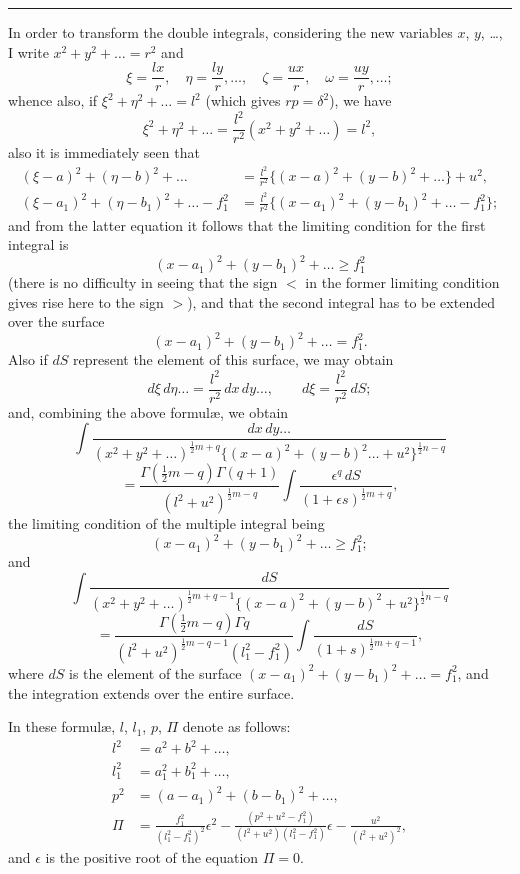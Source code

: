 \documentclass[11pt]{article}
\begin{document}
\vspace{1em}
\noindent\rule{\textwidth}{0.4pt}
\vspace{0.5em}

\noindent In order to transform the double integrals, considering the new variables $x$, $y$, \ldots, I write $x^2+y^2+\ldots = r^2$ and
\[
\xi = \frac{lx}{r}, \quad \eta = \frac{ly}{r}, \ldots, \quad \zeta = \frac{ux}{r}, \quad \omega = \frac{uy}{r}, \ldots;
\]
whence also, if $\xi^2 + \eta^2 + \ldots = l^2$ (which gives $rp = \delta^2$), we have
\[
\xi^2 + \eta^2 + \ldots = \frac{l^2}{r^2}(x^2+y^2+\ldots) = l^2,
\]
also it is immediately seen that
\begin{align*}
(\xi-a)^2 + (\eta-b)^2 + \ldots &= \frac{l^2}{r^2}\{(x-a)^2 + (y-b)^2 + \ldots\} + u^2,\\
(\xi-a_1)^2 + (\eta-b_1)^2 + \ldots - f_1^2 &= \frac{l^2}{r^2}\{(x-a_1)^2 + (y-b_1)^2 + \ldots - f_1^2\};
\end{align*}
and from the latter equation it follows that the limiting condition for the first integral is
\[
(x-a_1)^2 + (y-b_1)^2 + \ldots \ge f_1^2
\]
(there is no difficulty in seeing that the sign $<$ in the former limiting condition gives rise here to the sign $>$), and that the second integral has to be extended over the surface
\[
(x-a_1)^2 + (y-b_1)^2 + \ldots = f_1^2.
\]
Also if $dS$ represent the element of this surface, we may obtain
\[
d\xi\, d\eta \ldots = \frac{l^2}{r^2}\, dx\, dy \ldots, \qquad d\xi = \frac{l^2}{r^2}\, dS;
\]
and, combining the above formul\ae, we obtain
\[
\int \frac{dx\, dy \ldots}{(x^2+y^2+\ldots)^{\frac{1}{2}m+q}\{(x-a)^2+(y-b)^2\ldots+u^2\}^{\frac{1}{2}n-q}}
\]
\[
= \frac{\Gamma(\frac{1}{2}m-q)\Gamma(q+1)}{(l^2+u^2)^{\frac{1}{2}m-q}} \int \frac{\epsilon^q \, dS}{(1+\epsilon s)^{\frac{1}{2}m+q}},
\]
the limiting condition of the multiple integral being
\[
(x-a_1)^2 + (y-b_1)^2 + \ldots \ge f_1^2;
\]
and
\[
\int \frac{dS}{(x^2+y^2+\ldots)^{\frac{1}{2}m+q-1}\{(x-a)^2+(y-b)^2+u^2\}^{\frac{1}{2}n-q}}
\]
\[
= \frac{\Gamma(\frac{1}{2}m-q)\Gamma q}{(l^2+u^2)^{\frac{1}{2}m-q-1}(l_1^2-f_1^2)} \int \frac{dS}{(1+s)^{\frac{1}{2}m+q-1}},
\]
where $dS$ is the element of the surface $(x-a_1)^2 + (y-b_1)^2 + \ldots = f_1^2$, and the integration extends over the entire surface.

In these formul\ae, $l$, $l_1$, $p$, $\Pi$ denote as follows:
\begin{align*}
l^2 &= a^2 + b^2 + \ldots,\\
l_1^2 &= a_1^2 + b_1^2 + \ldots,\\
p^2 &= (a-a_1)^2 + (b-b_1)^2 + \ldots,\\
\Pi &= \frac{f_1^2}{(l_1^2-f_1^2)^2} \epsilon^2 - \frac{(p^2+u^2-f_1^2)}{(l^2+u^2)(l_1^2-f_1^2)} \epsilon - \frac{u^2}{(l^2+u^2)^2},
\end{align*}
and $\epsilon$ is the positive root of the equation $\Pi = 0$.
\end{document}
